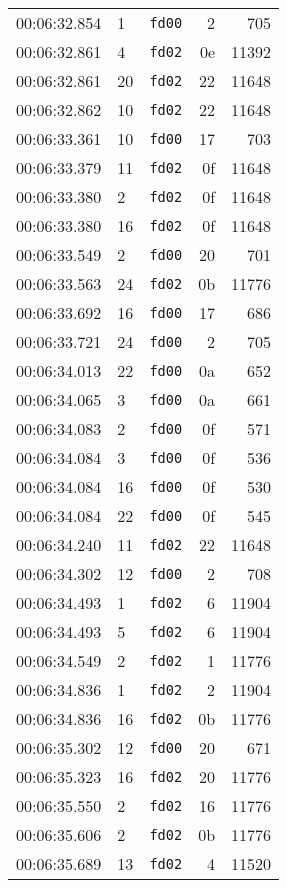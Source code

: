 \documentclass{article}
\begin{document}
\begin{longtable}{lllrr}
00:06:32.854 & 1 & \texttt{fd00} & 2 & 705 \\
00:06:32.861 & 4 & \texttt{fd02} & 0e & 11392 \\
00:06:32.861 & 20 & \texttt{fd02} & 22 & 11648 \\
00:06:32.862 & 10 & \texttt{fd02} & 22 & 11648 \\
00:06:33.361 & 10 & \texttt{fd00} & 17 & 703 \\
00:06:33.379 & 11 & \texttt{fd02} & 0f & 11648 \\
00:06:33.380 & 2 & \texttt{fd02} & 0f & 11648 \\
00:06:33.380 & 16 & \texttt{fd02} & 0f & 11648 \\
00:06:33.549 & 2 & \texttt{fd00} & 20 & 701 \\
00:06:33.563 & 24 & \texttt{fd02} & 0b & 11776 \\
00:06:33.692 & 16 & \texttt{fd00} & 17 & 686 \\
00:06:33.721 & 24 & \texttt{fd00} & 2 & 705 \\
00:06:34.013 & 22 & \texttt{fd00} & 0a & 652 \\
00:06:34.065 & 3 & \texttt{fd00} & 0a & 661 \\
00:06:34.083 & 2 & \texttt{fd00} & 0f & 571 \\
00:06:34.084 & 3 & \texttt{fd00} & 0f & 536 \\
00:06:34.084 & 16 & \texttt{fd00} & 0f & 530 \\
00:06:34.084 & 22 & \texttt{fd00} & 0f & 545 \\
00:06:34.240 & 11 & \texttt{fd02} & 22 & 11648 \\
00:06:34.302 & 12 & \texttt{fd00} & 2 & 708 \\
00:06:34.493 & 1 & \texttt{fd02} & 6 & 11904 \\
00:06:34.493 & 5 & \texttt{fd02} & 6 & 11904 \\
00:06:34.549 & 2 & \texttt{fd02} & 1 & 11776 \\
00:06:34.836 & 1 & \texttt{fd02} & 2 & 11904 \\
00:06:34.836 & 16 & \texttt{fd02} & 0b & 11776 \\
00:06:35.302 & 12 & \texttt{fd00} & 20 & 671 \\
00:06:35.323 & 16 & \texttt{fd02} & 20 & 11776 \\
00:06:35.550 & 2 & \texttt{fd02} & 16 & 11776 \\
00:06:35.606 & 2 & \texttt{fd02} & 0b & 11776 \\
00:06:35.689 & 13 & \texttt{fd02} & 4 & 11520 \\

\end{longtable}
\end{document}
